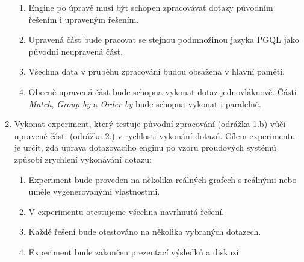 \begin{enumerate}
\begin{enumerate}
\item 
Engine po úpravě musí být schopen zpracovávat dotazy původním řešením i upraveným řešením.

\item
Upravená část bude pracovat se stejnou podmnožinou jazyka PGQL jako původní neupravená část.

\item
Všechna data v průběhu zpracování budou obsažena v hlavní paměti.

\item
Obecně upravená část bude schopna vykonat dotaz jednovláknově.
Části \textit{Match}, \textit{Group by} a \textit{Order by} bude schopna vykonat i paralelně.
\end{enumerate}

\item
Vykonat experiment, který testuje původní zpracování (odrážka 1.b) vůči upravené části (odrážka 2.) v rychlosti vykonání dotazů.
Cílem experimentu je určit, zda úprava dotazovacího enginu po vzoru proudových systémů způsobí zrychlení vykonávání dotazu:
\begin{enumerate}
\item Experiment bude proveden na několika reálných grafech s reálnými nebo uměle vygenerovanými vlastnostmi.
\item V experimentu otestujeme všechna navrhnutá řešení.
\item Každé řešení bude otestováno na několika vybraných dotazech.
\item Experiment bude zakončen prezentací výsledků a diskuzí.
\end{enumerate}
\end{enumerate}